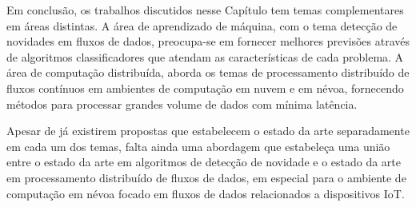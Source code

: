 
\newcommand{\iot}{IoT\xspace}

\newcommand{\stream}{\emph{data stream}\xspace}
\newcommand{\streams}{\emph{data streams}\xspace}
\newcommand{\streamMining}{\emph{data stream mining}\xspace}



Em conclusão, os trabalhos discutidos nesse Capítulo tem temas complementares em
áreas distintas.
A área de aprendizado de máquina, com o tema detecção de novidades em fluxos de
dados, preocupa-se em fornecer melhores previsões através de algoritmos
classificadores que atendam as características de cada problema.
A área de computação distribuída, aborda os temas de processamento distribuído
de fluxos contínuos em ambientes de computação em nuvem e em névoa, fornecendo
métodos para processar grandes volume de dados com mínima latência.

Apesar de já existirem propostas que estabelecem o estado da arte separadamente
em cada um dos temas, falta ainda uma abordagem que estabeleça uma união entre o
estado da arte em algoritmos de detecção de novidade e o estado da arte em
processamento distribuído de fluxos de dados, em especial para o ambiente de
computação em névoa focado em fluxos de dados relacionados a dispositivos \iot.
